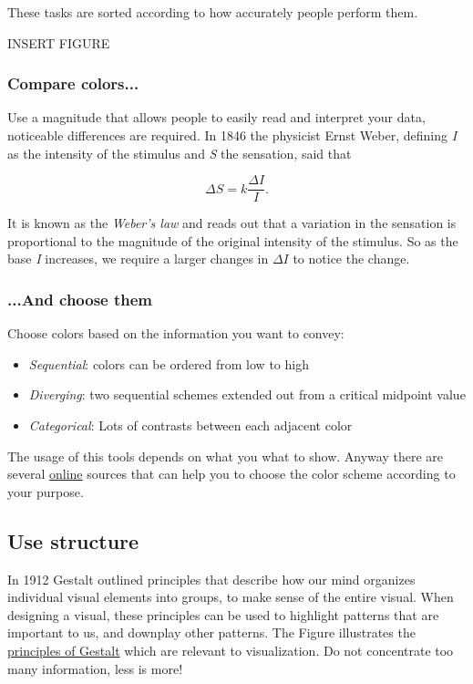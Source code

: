 These tasks are sorted according to how accurately people perform them.


INSERT FIGURE

\subsubsection*{Compare colors...}
Use a magnitude that allows people to easily read and interpret your data, noticeable differences are required. In 1846 the physicist Ernst Weber, defining \emph{I} as the intensity of the stimulus and \emph{S} the sensation, said that

$$\Delta S = k \frac{\Delta I}{I}.$$

It is known as the \emph{Weber's law} and reads out that a variation in the sensation is proportional to the magnitude of the original intensity of the stimulus. So as the base \emph{I} increases, we require a larger changes in  $\Delta I$ to notice the change. 

\subsubsection*{...And choose them}

Choose colors based on the information you want to convey:

\begin{itemize}
\item \emph{Sequential}: colors can be ordered from low to high
\item \emph{Diverging}: two sequential schemes extended out from a critical midpoint value 
\item \emph{Categorical}: Lots of contrasts between each adjacent color
\end{itemize}

The usage of this tools depends on what you what to show. Anyway there are several \href{http://colorbrewer2.org/#type=sequential\&scheme=BuGn&n=3}{online} sources that can help you to choose the color scheme according to your purpose.

\subsection*{Use structure}

In 1912 Gestalt outlined principles that describe how our mind organizes individual visual elements into groups, to make sense of the entire visual. When designing a visual, these principles can be used to highlight patterns that are important to us, and downplay other patterns. The Figure  illustrates the \href{http://www.fusioncharts.com/blog/2014/03/how-to-use-the-gestalt-principles-for-visual-storytelling-podv/}{principles of Gestalt} which are relevant to visualization. Do not concentrate too many information, less is more!

